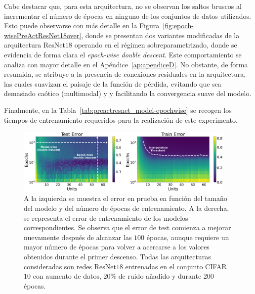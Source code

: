 Cabe destacar que, para esta arquitectura, no se observan los saltos bruscos al incrementar el número de épocas en ninguno de los conjuntos de datos utilizados. Esto puede observarse con más detalle en la Figura~\ref{fig:epoch-wisePreActResNet18over}, donde se presentan dos variantes modificadas de la arquitectura ResNet$18$ operando en el régimen sobreparametrizado, donde se evidencia de forma clara el \textit{epoch-wise double descent}. Este comportamiento se analiza con mayor detalle en el Apéndice~\ref{ap:apendiceD}. No obstante, de forma resumida, se atribuye a la presencia de conexiones residuales en la arquitectura, las cuales suavizan el paisaje de la función de pérdida, evitando que sea demasiado caótico (multimodal) y y facilitando la convergencia suave del modelo.

Finalmente, en la Tabla~\ref{tab:preactresnet_model-epochwise} se recogen los tiempos de entrenamiento requeridos para la realización de este experimento.

\begin{figure}[h]
    \centering
    \includegraphics[width=0.95\textwidth]{img/experiments/model-epochPreActResNet18CIFAR10augmented.png}
    \caption[Doble descenso en función del tamaño del modelo y del número de épocas para la red ResNet$18$ y el conjunto CIFAR$10$.]{A la izquierda se muestra el error en prueba en función del tamaño del modelo y del número de épocas de entrenamiento. A la derecha, se representa el error de entrenamiento de los modelos correspondientes. Se observa que el error de test comienza a mejorar nuevamente después de alcanzar las $100$ épocas, aunque requiere un mayor número de épocas para volver a acercarse a los valores obtenidos durante el primer descenso. Todas las arquitecturas consideradas son redes ResNet$18$ entrenadas en el conjunto CIFAR$10$ con aumento de datos\protect\footnotemark, $20\%$ de ruido añadido y durante $200$ épocas.}\label{fig:model-epochPreActResNet18CIFAR10}
\end{figure}


